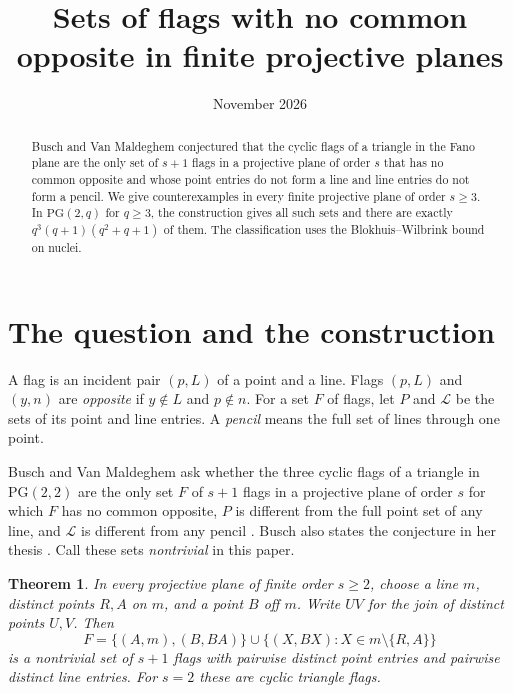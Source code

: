 \documentclass[11pt,a4paper]{amsart}
\title{Sets of flags with no common opposite in finite projective planes}
\date{November 2026}
\newtheorem{theorem}{Theorem}
\newcommand{\PG}{\mathrm{PG}}
\begin{document}
\begin{abstract}
Busch and Van Maldeghem conjectured that the cyclic flags of a triangle in the Fano plane are the only set of \(s+1\) flags in a projective plane of order \(s\) that has no common opposite and whose point entries do not form a line and line entries do not form a pencil. We give counterexamples in every finite projective plane of order \(s\geq 3\). In \(\PG(2,q)\) for \(q\geq 3\), the construction gives all such sets and there are exactly \(q^3(q+1)(q^2+q+1)\) of them. The classification uses the Blokhuis--Wilbrink bound on nuclei.
\end{abstract}
\maketitle

\section{The question and the construction}

A flag is an incident pair \((p,L)\) of a point and a line. Flags \((p,L)\) and \((y,n)\) are \emph{opposite} if \(y\notin L\) and \(p\notin n\). For a set \(F\) of flags, let \(P\) and \(\mathcal L\) be the sets of its point and line entries. A \emph{pencil} means the full set of lines through one point.

Busch and Van Maldeghem ask whether the three cyclic flags of a triangle in \(\PG(2,2)\) are the only set \(F\) of \(s+1\) flags in a projective plane of order \(s\) for which \(F\) has no common opposite, \(P\) is different from the full point set of any line, and \(\mathcal L\) is different from any pencil \cite[Remark~5.4 in arXiv versions 1 and 2]{BuschVanMaldeghem}. Busch also states the conjecture in her thesis \cite[Remark~9.9.0.4, p.~308]{Busch}. Call these sets \emph{nontrivial} in this paper.

\begin{theorem}\label{thm:construction}
In every projective plane of finite order \(s\geq2\), choose a line \(m\), distinct points \(R,A\) on \(m\), and a point \(B\) off \(m\). Write \(UV\) for the join of distinct points \(U,V\). Then
\[
F=\{(A,m),(B,BA)\}\cup\{(X,BX): X\in m\setminus\{R,A\}\}
\]
is a nontrivial set of \(s+1\) flags with pairwise distinct point entries and pairwise distinct line entries. For \(s=2\) these are cyclic triangle flags.
\end{theorem}
\end{document}
